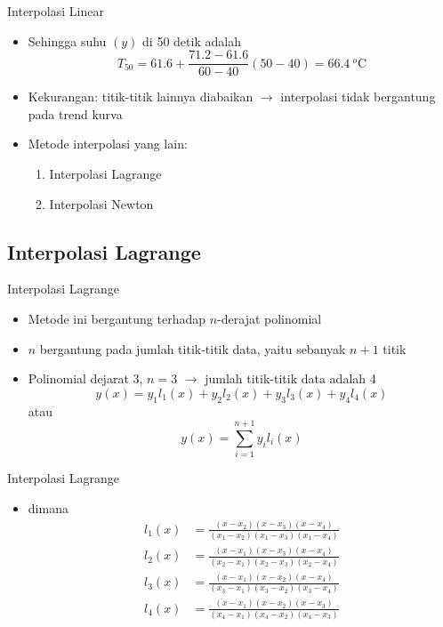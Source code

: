 \documentclass[pdflatex,compress,mathserif]{beamer}
\begin{document}
\begin{frame}{Interpolasi Linear}
	\begin{itemize}
		\item Sehingga suhu $(y)$ di 50 detik adalah
		$$ T_{50} = 61.6 + \frac{71.2 - 61.6}{60 - 40}(50 - 40) = 66.4~^o\text{C} $$
		\item Kekurangan: titik-titik lainnya diabaikan $\rightarrow$ interpolasi tidak bergantung pada trend kurva
		\item Metode interpolasi yang lain:
		\begin{enumerate}
			\item Interpolasi Lagrange
			\item Interpolasi Newton
		\end{enumerate}
	\end{itemize}
\end{frame}

\subsection{Interpolasi Lagrange}

\begin{frame}{Interpolasi Lagrange}
	\begin{itemize}
		\item Metode ini bergantung terhadap $n$-derajat polinomial
		\item $n$ bergantung pada jumlah titik-titik data, yaitu sebanyak $n+1$ titik
		\item Polinomial dejarat 3, $n = 3$ $\rightarrow$ jumlah titik-titik data adalah 4
		$$ y(x) = y_1l_1(x) + y_2l_2(x) + y_3l_3(x) + y_4l_4(x)$$
		atau
		$$ y(x) = \sum_{i = 1}^{n+1} y_i l_i (x) $$
	\end{itemize}
\end{frame}

\begin{frame}{Interpolasi Lagrange}
	\begin{itemize}
		\item[]
		dimana
		\begin{align*}
			l_1(x) &= \frac{(x-x_2)(x-x_3)(x-x_4)}{(x_1-x_2)(x_1-x_3)(x_1-x_4)} \\
			l_2(x) &= \frac{(x-x_1)(x-x_3)(x-x_4)}{(x_2-x_1)(x_2-x_3)(x_2-x_4)} \\
			l_3(x) &= \frac{(x-x_1)(x-x_2)(x-x_4)}{(x_3-x_1)(x_3-x_2)(x_3-x_4)} \\
			l_4(x) &= \frac{(x-x_1)(x-x_2)(x-x_3)}{(x_4-x_1)(x_4-x_2)(x_4-x_3)} \\
		\end{align*}
	\end{itemize}
\end{frame}
\end{document}
